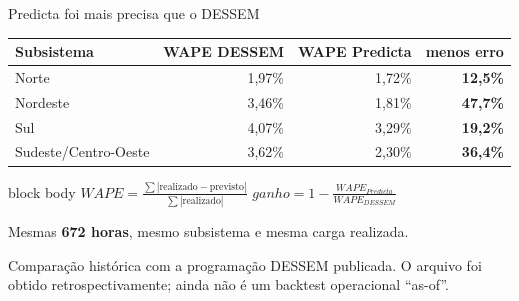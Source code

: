 \documentclass[aspectratio=169,11pt]{beamer}
\begin{document}
\begin{frame}{Predicta foi mais precisa que o DESSEM}
  \small
  \begin{table}
    \centering
    \begin{tabular}{lrrr}
      \toprule
      \textbf{Subsistema} & \textbf{WAPE DESSEM} & \textbf{WAPE Predicta} & \textbf{menos erro} \\
      \midrule
      Norte & 1,97\% & 1,72\% & \textbf{12,5\%} \\
      Nordeste & 3,46\% & 1,81\% & \textbf{47,7\%} \\
      Sul & 4,07\% & 3,29\% & \textbf{19,2\%} \\
      Sudeste/Centro-Oeste & 3,62\% & 2,30\% & \textbf{36,4\%} \\
      \bottomrule
    \end{tabular}
  \end{table}
  \vspace{2mm}
  \begin{beamercolorbox}[rounded=true,sep=3mm]{block body}
    \centering
    $\displaystyle WAPE=\frac{\sum |\mathrm{realizado}-\mathrm{previsto}|}{\sum |\mathrm{realizado}|}$\qquad
    $\displaystyle ganho=1-\frac{WAPE_{Predicta}}{WAPE_{DESSEM}}$
  \end{beamercolorbox}
  \vspace{2mm}
  \centering
  {\small Mesmas \textbf{672 horas}, mesmo subsistema e mesma carga realizada.}\par
  {\scriptsize\textcolor{cinza}{Comparação histórica com a programação DESSEM publicada. O arquivo foi obtido retrospectivamente; ainda não é um backtest operacional ``as-of''.}}
\end{frame}
\end{document}
